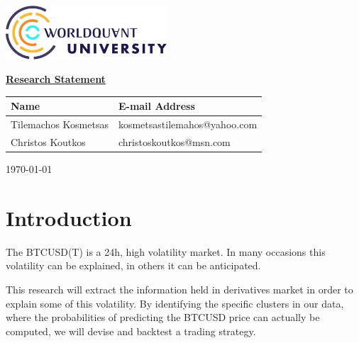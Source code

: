 \documentclass[11pt]{article}
\begin{document}
\begin{titlepage}

\begin{center}
\includegraphics[width=6cm, height=2cm]{wqu_logo.jpg}
\end{center}


\vfill
\begin{center}
\Huge \textbf{\underline{Research Statement}}

\end{center}
\vfill


\begin{center}
\textbf{}
\end{center}


\begin{table}[h]
\renewcommand{\arraystretch}{1.5}
\begin{center}
\begin{tabular}{  l  l  }

Name & E-mail Address \\[1pt]
\hline

Tilemachos Kosmetsas & kosmetsastilemahos@yahoo.com \\[1pt]

Christos Koutkos & christoskoutkos@msn.com \\[1pt]

\end{tabular}
\end{center}
\end{table}


\begin{center}
\today\\
\end{center}

\end{titlepage}


\setcounter{page}{1}

\section*{Introduction}
The BTCUSD(T) is a 24h, high volatility market. In many occasions this volatility can be explained, in others it can be anticipated. 

This research will extract the information held in derivatives market in order to explain some of this volatility. By identifying the specific clusters in our data, where the probabilities of predicting the BTCUSD price can actually be computed, we will devise and backtest a trading strategy.
\end{document}

